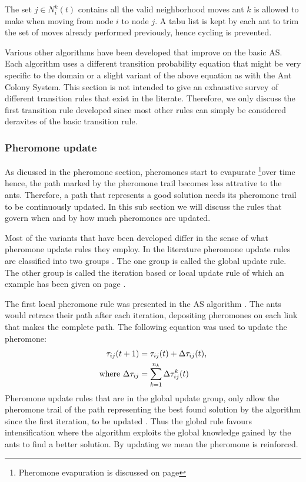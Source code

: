 The set $j \in N^k_i(t)$ contains all the valid neighborhood moves ant $k$ is allowed to make when moving from node $i$ to node $j$. A tabu list is kept by each ant to trim the set of moves already performed previously, hence cycling is prevented.

Various other algorithms have been developed that improve on the basic AS. Each algorithm uses a different transition probability equation that might be very specific to the domain or a slight variant of the above equation as with the Ant Colony System. This section is not intended to give an exhaustive survey of different transition rules that exist in the literate. Therefore, we only discuss the first transition rule developed since most other rules can simply be considered deravites of the basic transition rule.
\subsubsection{Pheromone update}
As dicussed in the pheromone section, pheromones start to evapurate \footnote{Pheromone evapuration is discussed on page \pageref{sec:pheromoneevapuation}}over time hence, the path marked by the pheromone trail becomes less attrative to the ants. Therefore, a path that represents a good solution needs its pheromone trail to be continuously updated. In this sub section we will discuss the rules that govern when and by how much pheromones are updated.

 Most of the variants that have been developed differ in the sense of what pheromone update rules they employ. In the literature pheromone update rules are classified into two groups \cite{CompuIntelligenceIntro}. The one group is called the global update rule. The other group is called the iteration based or local update rule of which an example has been given on page \pageref{def:localpheromoneupdate} \cite{CompuIntelligenceIntro}. 

The first local pheromone rule was presented in the AS algorithm \cite{CompuIntelligenceIntro}. The ants would retrace their path after each iteration, depositing pheromones on each link that makes the complete path. The following equation was used to update the pheromone:
\begin{align}
 \tau_{ij}(t+1) &= \tau_{ij}(t) + \Delta\tau_{ij}(t),\\ 
 \text{where }\Delta\tau_{ij} &= \sum^{n_k}_{k=1}\Delta\tau^k_{ij}(t) \notag
\end{align}
Pheromone update rules that are in the global update group, only allow the pheromone trail of the path representing the best found solution by the algorithm since the first iteration, to be updated \cite{CompuIntelligenceIntro}. Thus the global rule favours intensification where the algorithm exploits the global knowledge gained by the ants to find a better solution. By updating we mean the pheromone is reinforced. 

